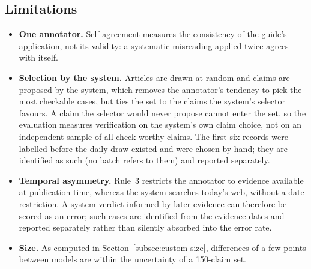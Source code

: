 
\subsection{Limitations}
\label{subsec:custom-limitations}

\begin{itemize}
    \item \textbf{One annotator.} Self-agreement measures the
    consistency of the guide's application, not its validity: a
    systematic misreading applied twice agrees with itself.
    \item \textbf{Selection by the system.} Articles are drawn at
    random and claims are proposed by the system, which removes the
    annotator's tendency to pick the most checkable cases, but ties
    the set to the claims the system's selector favours. A claim the
    selector would never propose cannot enter the set, so the
    evaluation measures verification on the system's own claim
    choice, not on an independent sample of all check-worthy claims.
    The first six records were labelled before the daily draw existed
    and were chosen by hand; they are identified as such (no batch
    refers to them) and reported separately.
    \item \textbf{Temporal asymmetry.} Rule~3 restricts the
    annotator to evidence available at publication time, whereas the
    system searches today's web, without a date restriction. A system
    verdict informed by later evidence can therefore be scored as an
    error; such cases are identified from the evidence dates and
    reported separately rather than silently absorbed into the error
    rate.
    \item \textbf{Size.} As computed in
    Section~\ref{subsec:custom-size}, differences of a few points
    between models are within the uncertainty of a 150-claim set.
\end{itemize}

